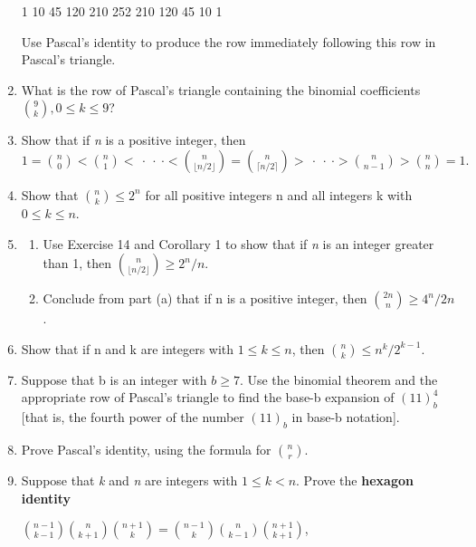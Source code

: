 \documentclass[11pt,a4paper]{book}
\begin{document}
\begin{enumerate}
1 10 45 120 210 252 210 120 45 10 1

Use Pascal’s identity to produce the row immediately following this row in Pascal’s triangle.
\item What is the row of Pascal’s triangle containing the binomial coefficients $\binom{9}{k}, 0 \leq k \leq 9$?
\item Show that if \emph{n} is a positive integer, then 
$1 = \binom{n}{0} < \binom{n}{1} <~\cdot~\cdot~\cdot< \binom{n}{\lfloor n/2\rfloor} = \binom{n}{\lceil n/2\rceil} >~\cdot~\cdot~\cdot> \binom{n}{n-1} > \binom{n}{n} = 1.$
\item Show that $\binom{n}{k} \leq 2^{n}$ for all positive integers n and all integers k with $0 \leq k \leq n.$
\item \begin{enumerate}[label=(\alph*)]
\item Use Exercise 14 and Corollary 1 to show that if \emph{n} is an integer greater than 1, then $\binom{n}{\lfloor n/2\rfloor} \geq 2^{n}/n$.
\item Conclude from part (a) that if n is a positive integer, then $\binom{2n}{n} \geq 4^{n}/2n$.
\end{enumerate}
\item Show that if n and k are integers with $1 \leq k \leq n$, then $\binom{n}{k} \leq n^{k}/2^{k-1}.$
\item Suppose that b is an integer with $b \geq 7$.
Use the binomial theorem and the appropriate row of Pascal’s triangle to find the base-b expansion of $(11)^{4}_{b}$ [that is, the fourth power of the number $(11)_{b}$ in base-b notation].
\item Prove Pascal’s identity, using the formula for $\binom{n}{r}$.
\item Suppose that \emph{k} and \emph{n} are integers with $1 \leq k < n$.
Prove the \textbf{hexagon identity}

$\binom{n-1}{k-1}\binom{n}{k+1}\binom{n+1}{k} = \binom{n-1}{k}\binom{n}{k-1}\binom{n+1}{k+1}$,


\end{enumerate}
\end{document}

